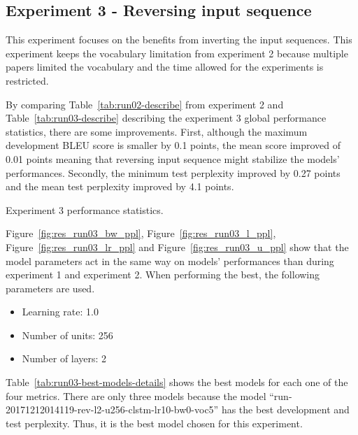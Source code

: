 \subsection{Experiment 3 - Reversing input sequence}
This experiment focuses on the benefits from inverting the input sequences. This experiment keeps the vocabulary limitation from experiment 2 because multiple papers limited the vocabulary \citep{ecm-1704.01074,1503.02364,1506.05869,1703.01619,tensorflow.nmt} and the time allowed for the experiments is restricted.

By comparing Table~\ref{tab:run02-describe} from experiment 2 and Table~\ref{tab:run03-describe} describing the experiment 3 global performance statistics, there are some improvements. First, although the maximum development BLEU score is smaller by \num{0.1} points, the mean score improved of \num{0.01} points meaning that reversing input sequence might stabilize the models' performances. Secondly, the minimum test perplexity improved by \num{0.27} points and the mean test perplexity improved by \num{4.1} points.

\begin{table}
    \centering
    \caption[Experiment 3 performance statistics]{Experiment 3 performance statistics.}
    \label{tab:run03-describe}
    
\end{table}

Figure~\ref{fig:res_run03_bw_ppl}, Figure~\ref{fig:res_run03_l_ppl}, Figure~\ref{fig:res_run03_lr_ppl} and Figure~\ref{fig:res_run03_u_ppl} show that the model parameters act in the same way on models' performances than during experiment 1 and experiment 2. When performing the best, the following parameters are used.
\begin{itemize}
    \item Learning rate: 1.0
    \item Number of units: 256
    \item Number of layers: 2
\end{itemize}

Table~\ref{tab:run03-best-models-details} shows the best models for each one of the four metrics. There are only three models because the model ``run-20171212014119-rev-l2-u256-clstm-lr10-bw0-voc5'' has the best development and test perplexity. Thus, it is the best model chosen for this experiment.


